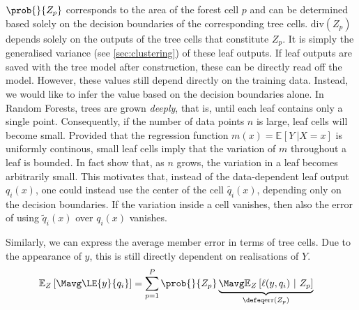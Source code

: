 \documentclass[
    a4paper, %
	fontsize=10pt, %
	twoside=false, %
]{kaobook}
\begin{document}
\begin{titlepage}
$\prob{}{Z_{p}}$ corresponds to the area of the forest cell $p$ and can be determined based solely on the decision boundaries of the corresponding tree cells.
$\text{div}(Z_{p})$ depends solely on the outputs of the tree cells that constitute $Z_{p}$. It is simply the generalised variance (see \ref{sec:clustering}) of these leaf outputs. If leaf outputs are saved with the tree model after construction, these can be directly read off the model. However, these values still depend directly on the training data. Instead, we would like to infer the value based on the decision boundaries alone.
In Random Forests, trees are grown \textit{deeply}, that is, until each leaf contains only a single point. Consequently, if the number of data points $n$ is large, leaf cells will become small. Provided that the regression function $m(x) = \mathbb{E}_{}\left[ Y ~| X=x \right]$ is uniformly continous, small leaf cells imply that the variation of $m$ throughout a leaf is bounded. 
In fact \cite{scornet} show
that, as $n$ grows, the variation in a leaf becomes arbitrarily small.
This motivates that, instead of the data-dependent leaf output $q_{i}(x)$, one could instead use the center of the cell $\tilde{q_{i}}(x)$, depending only on the decision boundaries. If the variation inside a cell vanishes, then also the error of using $\tilde{q}_{i}(x)$ over $q_{i}(x)$ vanishes.

Similarly, we can express the average member error in terms of tree cells. Due to the appearance of $y$, this is still directly dependent on realisations of $Y$.
\begin{align*}
\mathbb{E}_{Z}\left[ \Mavg \LE{y}{q_{i}} \right] &= \sum_{p=1}^P \prob{}{Z_{p}}  
\underbrace{
\Mavg \mathbb{E}_{Z}\left[ \ell(y, q_{i} ) ~|~Z_{p} \right]  
}_{\defeq  \text{err}(Z_{p}) }
\end{align*}


\end{titlepage}
\end{document}
